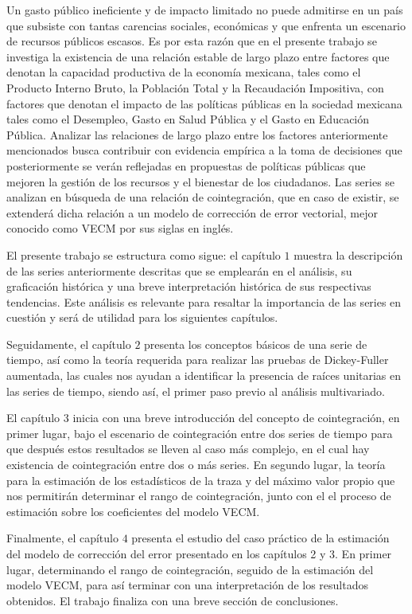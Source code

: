 




Un gasto público ineficiente y de impacto limitado no puede admitirse en un país que subsiste con tantas carencias sociales, económicas y que enfrenta un escenario de recursos públicos escasos. Es por esta razón que en el presente trabajo se investiga la existencia de una relación estable de largo plazo entre factores que denotan la capacidad productiva de la economía mexicana, tales como el Producto Interno Bruto, la Población Total y la Recaudación Impositiva, con factores que denotan el impacto de las políticas públicas en la sociedad mexicana tales como el Desempleo, Gasto en Salud Pública y el Gasto en Educación Pública. Analizar las relaciones de largo plazo entre los factores anteriormente mencionados busca contribuir con evidencia empírica a la toma de decisiones que posteriormente se verán reflejadas en propuestas de políticas públicas que mejoren la gestión de los recursos y el bienestar de los ciudadanos. Las series se analizan en búsqueda de una relación de cointegración, que en caso de existir, se extenderá dicha relación a un modelo de corrección de error vectorial, mejor conocido como VECM por sus siglas en inglés.\bigskip

El presente trabajo se estructura como sigue: el capítulo $1$ muestra la descripción de las series anteriormente descritas que se emplearán en el análisis, su graficación histórica y una breve interpretación histórica de sus respectivas tendencias. Este análisis es relevante para resaltar la importancia de las series en cuestión y será de utilidad para los siguientes capítulos. \bigskip

Seguidamente, el capítulo $2$ presenta los conceptos básicos de una serie de tiempo, así como la teoría requerida para realizar las pruebas de Dickey-Fuller aumentada, las cuales nos ayudan a identificar la presencia de raíces unitarias en las series de tiempo, siendo así, el primer paso previo al análisis multivariado. \bigskip


El capítulo $3$ inicia con una breve introducción del concepto de cointegración, en primer lugar, bajo el escenario de cointegración entre dos series de tiempo para que después estos resultados se lleven al caso más complejo, en el cual hay existencia de cointegración entre dos o más series. En segundo lugar, la teoría para la estimación de los estadísticos de la traza y del máximo valor propio que nos permitirán determinar el rango de cointegración, junto con el el proceso de estimación sobre los coeficientes del modelo VECM.\bigskip

Finalmente, el capítulo $4$ presenta el estudio del caso práctico de la estimación del modelo de corrección del error presentado en los capítulos 2 y 3. En primer lugar, determinando el rango de cointegración, seguido de la estimación del modelo VECM, para así terminar con una interpretación de los resultados obtenidos. El trabajo finaliza con una breve sección de conclusiones. 




